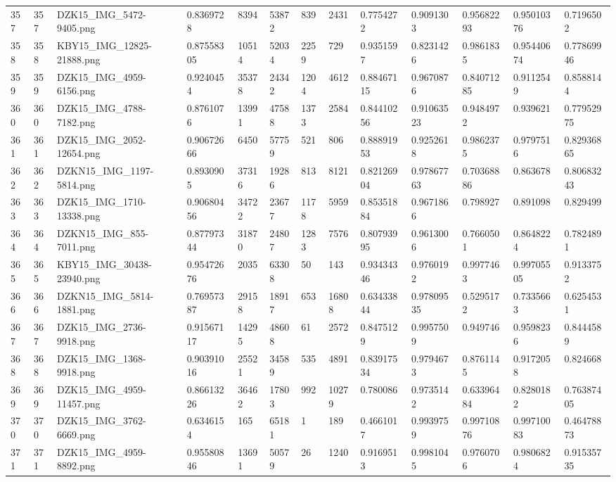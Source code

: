 \documentclass[11pt, a4paper, twoside]{report}
\begin{document}
\begin{longtable}[c]{@{}lllllllllllll@{}}
357 & 357 & DZK15\_IMG\_5472-9405.png & 0.8369728 & 8394 & 53872 & 839 & 2431 & 0.7754272 & 0.9091303 & 0.95682293 & 0.95010376 & 0.7196502 \\
358 & 358 & KBY15\_IMG\_12825-21888.png & 0.87558305 & 10514 & 52034 & 2259 & 729 & 0.9351597 & 0.8231426 & 0.9861835 & 0.95440674 & 0.77869946 \\
359 & 359 & DZK15\_IMG\_4959-6156.png & 0.9240454 & 35378 & 24342 & 1204 & 4612 & 0.88467115 & 0.9670876 & 0.84071285 & 0.9112549 & 0.8588144 \\
360 & 360 & DZK15\_IMG\_4788-7182.png & 0.8761076 & 13991 & 47588 & 1373 & 2584 & 0.84410256 & 0.91063523 & 0.9484972 & 0.939621 & 0.77952975 \\
361 & 361 & DZK15\_IMG\_2052-12654.png & 0.90672666 & 6450 & 57759 & 521 & 806 & 0.88891953 & 0.9252618 & 0.9862375 & 0.9797516 & 0.82936865 \\
362 & 362 & DZKN15\_IMG\_1197-5814.png & 0.8930905 & 37316 & 19286 & 813 & 8121 & 0.82126904 & 0.97867763 & 0.70368886 & 0.863678 & 0.80683243 \\
363 & 363 & DZK15\_IMG\_1710-13338.png & 0.90680456 & 34722 & 23677 & 1178 & 5959 & 0.85351884 & 0.9671866 & 0.798927 & 0.891098 & 0.829499 \\
364 & 364 & DZKN15\_IMG\_855-7011.png & 0.87797344 & 31870 & 24807 & 1283 & 7576 & 0.80793995 & 0.9613006 & 0.7660501 & 0.8648224 & 0.7824891 \\
365 & 365 & KBY15\_IMG\_30438-23940.png & 0.95472676 & 2035 & 63308 & 50 & 143 & 0.93434346 & 0.9760192 & 0.9977463 & 0.99705505 & 0.9133752 \\
366 & 366 & DZKN15\_IMG\_5814-1881.png & 0.76957387 & 29158 & 18917 & 653 & 16808 & 0.63433844 & 0.97809535 & 0.5295172 & 0.7335663 & 0.6254531 \\
367 & 367 & DZK15\_IMG\_2736-9918.png & 0.91567117 & 14295 & 48608 & 61 & 2572 & 0.8475129 & 0.9957509 & 0.949746 & 0.9598236 & 0.8444589 \\
368 & 368 & DZK15\_IMG\_1368-9918.png & 0.90391016 & 25521 & 34589 & 535 & 4891 & 0.83917534 & 0.9794673 & 0.8761145 & 0.9172058 & 0.824668 \\
369 & 369 & DZK15\_IMG\_4959-11457.png & 0.86613226 & 36462 & 17803 & 992 & 10279 & 0.780086 & 0.9735142 & 0.63396484 & 0.8280182 & 0.76387405 \\
370 & 370 & DZK15\_IMG\_3762-6669.png & 0.6346154 & 165 & 65181 & 1 & 189 & 0.4661017 & 0.9939759 & 0.99710876 & 0.99710083 & 0.46478873 \\
371 & 371 & DZK15\_IMG\_4959-8892.png & 0.95580846 & 13691 & 50579 & 26 & 1240 & 0.9169513 & 0.9981045 & 0.9760706 & 0.9806824 & 0.91535735 \\

\end{longtable}
\end{document}
